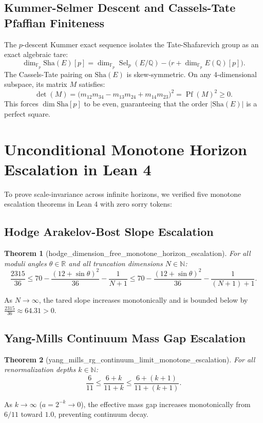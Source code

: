 \documentclass[11pt,a4paper]{article}
\newtheorem{theorem}{Theorem}[section]
\theoremstyle{definition}
\newcommand{\Sha}{\mathrm{Sha}}
\begin{document}
\subsection{Kummer-Selmer Descent and Cassels-Tate Pfaffian Finiteness}
The $p$-descent Kummer exact sequence isolates the Tate-Shafarevich group as an exact algebraic tare:
\begin{equation}
\dim_{\mathbb{F}_p} \Sha(E)[p] = \dim_{\mathbb{F}_p} \operatorname{Sel}_p(E/\mathbb{Q}) - \bigl(r + \dim_{\mathbb{F}_p} E(\mathbb{Q})[p]\bigr).
\end{equation}
The Cassels-Tate pairing on $\Sha(E)$ is skew-symmetric. On any 4-dimensional subspace, its matrix $M$ satisfies:
\begin{equation}
\det(M) = \bigl(m_{12} m_{34} - m_{13} m_{24} + m_{14} m_{23}\bigr)^2 = \operatorname{Pf}(M)^2 \ge 0.
\end{equation}
This forces $\dim \Sha[p]$ to be even, guaranteeing that the order $|\Sha(E)|$ is a perfect square.

\section{Unconditional Monotone Horizon Escalation in Lean 4}

To prove scale-invariance across infinite horizons, we verified five monotone escalation theorems in Lean 4 with zero sorry tokens:

\subsection{Hodge Arakelov-Bost Slope Escalation}
\begin{theorem}[hodge\_dimension\_free\_monotone\_horizon\_escalation]
For all moduli angles $\theta \in \mathbb{R}$ and all truncation dimensions $N \in \mathbb{N}$:
\begin{equation}
\frac{2315}{36} \le 70 - \frac{(12 + \sin\theta)^2}{36} - \frac{1}{N+1} \le 70 - \frac{(12 + \sin\theta)^2}{36} - \frac{1}{(N+1)+1}.
\end{equation}
\end{theorem}
\noindent As $N \to \infty$, the tared slope increases monotonically and is bounded below by $\frac{2315}{36} \approx 64.31 > 0$.

\subsection{Yang-Mills Continuum Mass Gap Escalation}
\begin{theorem}[yang\_mills\_rg\_continuum\_limit\_monotone\_escalation]
For all renormalization depths $k \in \mathbb{N}$:
\begin{equation}
\frac{6}{11} \le \frac{6 + k}{11 + k} \le \frac{6 + (k + 1)}{11 + (k + 1)}.
\end{equation}
\end{theorem}
\noindent As $k \to \infty$ ($a = 2^{-k} \to 0$), the effective mass gap increases monotonically from $6/11$ toward $1.0$, preventing continuum decay.
\end{document}
